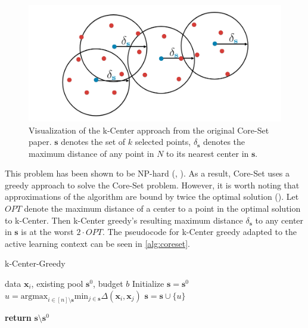 \documentclass[english,bachelor,ul]{webisthesis} %
\begin{document}
\begin{figure}[htbp]
    \centering
    \includegraphics[width=1\textwidth]{img/core-set.png}
    \caption{Visualization of the k-Center approach from the original Core-Set paper. $ \mathbf{s} $ denotes the set of $ k $ selected points, $ \delta_{\mathbf{s}} $ denotes the maximum distance of any point in $ N $ to its nearest center in $ \mathbf{s} $.}
    \label{fig:coreset}
\end{figure}

This problem has been shown to be NP-hard (\cite{DBLP:journals/dam/HsuN79}, \cite{DBLP:journals/anor/Hochbaum84}). As a result, Core-Set uses a greedy approach to solve the Core-Set problem. However, it is worth noting that approximations of the algorithm are bound by twice the optimal solution (\cite{DBLP:journals/dam/HsuN79}). Let $ OPT $ denote the maximum distance of a center to a point in the optimal solution to k-Center. Then k-Center greedy's resulting maximum distance $ \delta_{\mathbf{s}} $ to any center in $ \mathbf{s} $ is at the worst $ 2 \cdot OPT $. The pseudocode for k-Center greedy adapted to the active learning context can be seen in \ref{alg:coreset}.

\begin{algorithm}
\caption{k-Center-Greedy}%
\makeatletter{}\makeatother
\label{alg:coreset}
\begin{algorithmic}


\Require data $ \mathbf{x}_i $, existing pool $ \mathbf{s}^0 $, budget $ b $
\State Initialize $ \mathbf{s} = \mathbf{s}^0 $
\Repeat
\State $ u = \text{argmax}_{i \in [n] \setminus \mathbf{s}} \text{min}_{j \in \mathbf{s}} \Delta(\mathbf{x}_i, \mathbf{x}_j) $
\State $ \mathbf{s} = \mathbf{s} \cup \{u\} $

\State \textbf{return} $\mathbf{s} \setminus \mathbf{s}^0 $
\end{algorithmic}
\end{algorithm}
\end{document}

